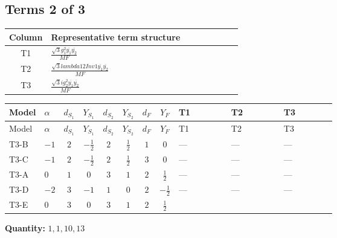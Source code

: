 \documentclass[8pt]{article}
\begin{document}
\begin{landscape}
\subsection*{Terms 2 of 3}
\begin{center}
\begin{tabular}{@{}c >{\raggedright\arraybackslash}p{0.82\linewidth}@{}}
\toprule
Column & Representative term structure \\
\midrule
T1 & \(\displaystyle \frac{\sqrt{3} g_{1}^{2} \overline{y_{1}} \overline{y_{2}}}{MF}\) \\
\midrule
T2 & \(\displaystyle \frac{\sqrt{3} lambda12Inv1 \overline{y_{1}} \overline{y_{2}}}{MF}\) \\
\midrule
T3 & \(\displaystyle \frac{\sqrt{3} i g_{2}^{2} \overline{y_{1}} \overline{y_{2}}}{MF}\) \\
\midrule
\bottomrule
\end{tabular}
\end{center}
\smallskip
\tiny
\begin{longtable}{@{}llcccccc >{\raggedright\arraybackslash}p{0.21\linewidth} >{\raggedright\arraybackslash}p{0.21\linewidth} >{\raggedright\arraybackslash}p{0.21\linewidth}@{}}
\toprule
Model & $\alpha$ & $d_{S_1}$ & $Y_{S_1}$ & $d_{S_2}$ & $Y_{S_2}$ & $d_F$ & $Y_F$ & T1 & T2 & T3 \\
\midrule
\endfirsthead
\toprule
Model & $\alpha$ & $d_{S_1}$ & $Y_{S_1}$ & $d_{S_2}$ & $Y_{S_2}$ & $d_F$ & $Y_F$ & T1 & T2 & T3 \\
\midrule
\endhead
T3-B & $-1$ & $2$ & $-\frac{1}{2}$ & $2$ & $\frac{1}{2}$ & $1$ & $0$ & --- & --- & --- \\
\midrule
T3-C & $-1$ & $2$ & $-\frac{1}{2}$ & $2$ & $\frac{1}{2}$ & $3$ & $0$ & --- & --- & --- \\
\midrule
T3-A & $0$ & $1$ & $0$ & $3$ & $1$ & $2$ & $\frac{1}{2}$ & --- & --- & --- \\
\midrule
T3-D & $-2$ & $3$ & $-1$ & $1$ & $0$ & $2$ & $-\frac{1}{2}$ & --- & --- & --- \\
\midrule
T3-E & $0$ & $3$ & $0$ & $3$ & $1$ & $2$ & $\frac{1}{2}$ & \scriptsize\adjustbox{max width=\linewidth}{$\begin{gathered} - \frac{\sqrt{3} g_{1}^{2} \overline{y_{1}} \overline{y_{2}}}{8 MF}\end{gathered}$} & \scriptsize\adjustbox{max width=\linewidth}{$\begin{gathered} \frac{\sqrt{3} lambda12Inv1 \overline{y_{1}} \overline{y_{2}}}{6 MF}\end{gathered}$} & \scriptsize\adjustbox{max width=\linewidth}{$\begin{gathered} \frac{\sqrt{3} i g_{2}^{2} \overline{y_{1}} \overline{y_{2}}}{6 MF}\end{gathered}$} \\
\midrule
\bottomrule
\end{longtable}
\clearpage
\noindent\textbf{Quantity: }$\mathrm{1,1,10,13}$\par\smallskip

\end{landscape}
\end{document}
